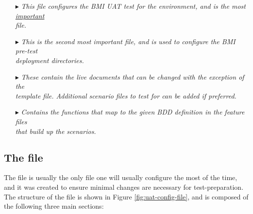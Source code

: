 \begin{itemize}


\item[\index{config directory}\code{config }$\blacktriangleright$\hspace{-12mm}] \hspace{10mm}\emph{This file configures the BMI UAT test for the environment, and is the most \underline{important}\\ \text{}\hspace{9mm} file.} \\

\item[\index{\code{bmi-config.sh} script}\code{bmi-config.sh }$\blacktriangleright$\hspace{-12mm}] \hspace{10mm}\emph{This is the second most important file, and is used to configure the BMI pre-test\\ \text{}\hspace{9mm} deployment directories.} \\

\item[\index{BDD features}\code{features }$\blacktriangleright$\hspace{-12mm}] \hspace{10mm}\emph{These contain the live documents that can be changed with the exception of the\\ \text{}\hspace{9mm} \emph{template} file.  Additional scenario files to test for can be added if preferred.} \\

\item[\index{BDD steps}\code{steps }$\blacktriangleright$\hspace{-12mm}] \hspace{10mm}\emph{Contains the functions that map to the given BDD definition in the \emph{feature} files\\ \text{}\hspace{9mm} that build up the scenarios.} \\

\end{itemize}

\subsection{The  file}

The  file is usually the only file one will usually configure the most of the time, and it was created to ensure minimal changes are necessary for test-preparation.  The structure of the file is shown in Figure \ref{fig:uat-config-file}, and is composed of the following three main sections: \\ %

